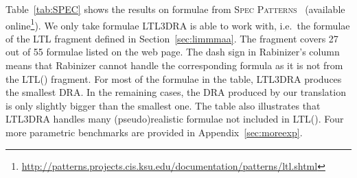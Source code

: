 \documentclass{llncs}
\begin{document}
Table~\ref{tab:SPEC} shows the results on formulae from \textsc{Spec
  Patterns}~\cite{DAC99} (available
online\footnote{\url{http://patterns.projects.cis.ksu.edu/documentation/patterns/ltl.shtml}}).
We only take formulae LTL3DRA is able to work with, i.e.~the formulae of the
LTL fragment defined in Section~\ref{sec:limmmaa}.  The fragment covers 27
out of 55 formulae listed on the web page.  The dash sign in Rabinizer's
column means that Rabinizer cannot handle the corresponding formula as it is
not from the LTL() fragment.  For most of the formulae in the table,
LTL3DRA produces the smallest DRA. In the remaining cases, the DRA produced
by our translation is only slightly bigger than the smallest one.  The table
also illustrates that LTL3DRA handles many (pseudo)realistic formulae not
included in LTL().  
Four more parametric benchmarks are provided in Appendix~\ref{sec:moreexp}.
\end{document}
